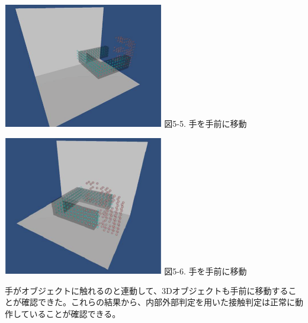   \vspace{5mm}
\begin{minipage}{0.5\hsize}
  \begin{center}
   \includegraphics[width=70mm]{temae_1.eps}
   図5-5. 手を手前に移動
  \end{center}
  \label{fig:one}
 \end{minipage}
 \begin{minipage}{0.5\hsize}
  \begin{center}
   \includegraphics[width=70mm]{temae_2.eps}
   図5-6. 手を手前に移動
     \end{center}
  \label{fig:two}
 \end{minipage}
 
 手がオブジェクトに触れるのと連動して、3Dオブジェクトも手前に移動することが確認できた。これらの結果から、内部外部判定を用いた接触判定は正常に動作していることが確認できる。
 
 
 